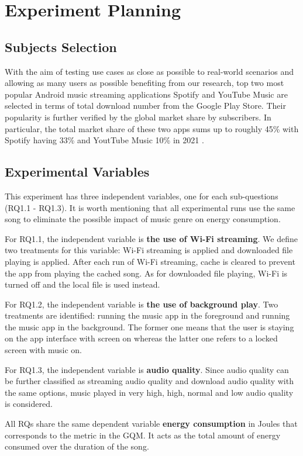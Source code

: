 \section{Experiment Planning}

\subsection{Subjects Selection}
With the aim of testing use cases as close as possible to real-world scenarios and allowing as many users as possible benefiting from our research, top two most popular Android music streaming applications Spotify and YouTube Music are selected in terms of total download number from the Google Play Store. Their popularity is further verified by the global market share by subscribers. In particular, the total market share of these two apps sums up to roughly 45\% with Spotify having 33\% and YoutTube Music 10\% in 2021 \cite{16}.
\subsection{Experimental Variables}
This experiment has three independent variables, one for each sub-questions (RQ1.1 - RQ1.3). It is worth mentioning that all experimental runs use the same song to eliminate the possible impact of music genre on energy consumption.

For RQ1.1, the independent variable is \textbf{the use of Wi-Fi streaming}. We define two treatments for this variable: Wi-Fi streaming is applied and downloaded file playing is applied. After each run of Wi-Fi streaming, cache is cleared to prevent the app from playing the cached song. As for downloaded file playing, Wi-Fi is turned off and the local file is used instead.  

For RQ1.2, the independent variable is \textbf{the use of background play}. Two treatments are identified: running the music app in the foreground and running the music app in the background. The former one means that the user is staying on the app interface with screen on whereas the latter one refers to a locked screen with music on. 

For RQ1.3, the independent variable is \textbf{audio quality}. Since audio quality can be further classified as streaming audio quality and download audio quality with the same options, music played in very high, high, normal and low audio quality is considered. 

All RQs share the same dependent variable \textbf{energy consumption} in Joules that corresponds to the metric in the GQM. It acts as the total amount of energy consumed over the duration of the song. 

